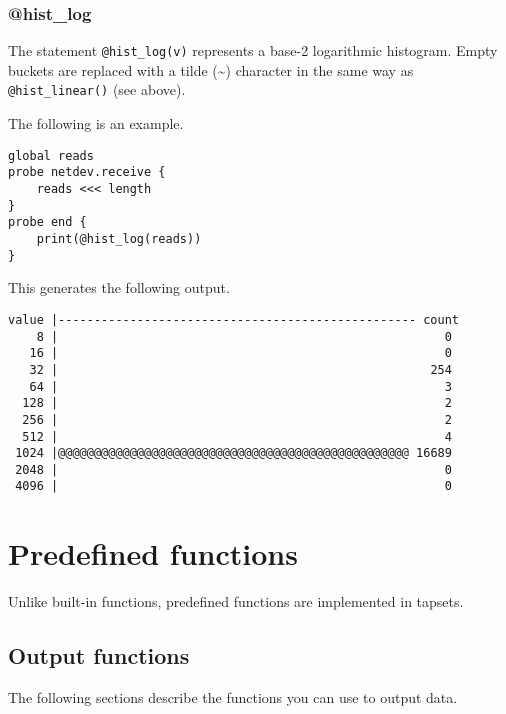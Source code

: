 \documentclass[twoside,english]{article}
\newenvironment{vindent}
{\begin{list}{}{\setlength{\listparindent}{6pt}}
\item[]}
{\end{list}}
\begin{document}
\subsubsection{@hist\_log}
The statement \texttt{@hist\_log(v)} represents a base-2 logarithmic
histogram.  Empty buckets are replaced with a tilde (\textasciitilde{})
character in the same way as \texttt{@hist\_linear()} (see above).

The following is an example.

\begin{vindent}
\begin{verbatim}
global reads
probe netdev.receive {
    reads <<< length
}
probe end {
    print(@hist_log(reads))
}
\end{verbatim}
\end{vindent}
This generates the following output.

\begin{vindent}
\begin{verbatim}
value |-------------------------------------------------- count
    8 |                                                      0
   16 |                                                      0
   32 |                                                    254
   64 |                                                      3
  128 |                                                      2
  256 |                                                      2
  512 |                                                      4
 1024 |@@@@@@@@@@@@@@@@@@@@@@@@@@@@@@@@@@@@@@@@@@@@@@@@@ 16689
 2048 |                                                      0
 4096 |                                                      0
\end{verbatim}
\end{vindent}

\section{Predefined functions\label{sec:Predefined-Functions}}

Unlike built-in functions, predefined functions are implemented in tapsets.


\subsection{Output functions}

The following sections describe the functions you can use to output data.
\end{document}
